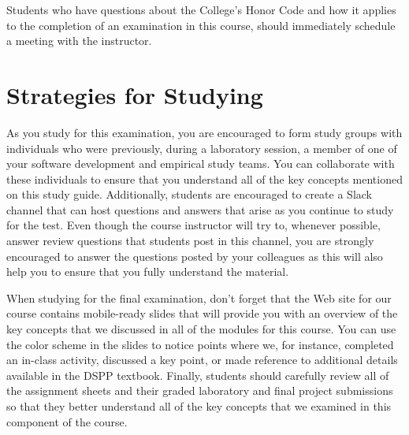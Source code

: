 \noindent Students who have questions about the College's Honor Code and how it applies to the completion of an
examination in this course, should immediately schedule a meeting with the instructor.

\vspace*{-.2in}
\section*{Strategies for Studying}
\vspace*{-.1in}


As you study for this examination, you are encouraged to form study groups with individuals who were previously, during
a laboratory session, a member of one of your software development and empirical study teams. You can collaborate with
these individuals to ensure that you understand all of the key concepts mentioned on this study guide. Additionally,
students are encouraged to create a Slack channel that can host questions and answers that arise as you continue to
study for the test.  Even though the course instructor will try to, whenever possible, answer review questions that
students post in this channel, you are strongly encouraged to answer the questions posted by your colleagues as this
will also help you to ensure that you fully understand the material.  

When studying for the final examination, don't forget that the Web site for our course contains mobile-ready slides that
will provide you with an overview of the key concepts that we discussed in all of the modules for this course. You can
use the color scheme in the slides to notice points where we, for instance, completed an in-class activity, discussed a
key point, or made reference to additional details available in the DSPP textbook. Finally, students should carefully
review all of the assignment sheets and their graded laboratory and final project submissions so that they better
understand all of the key concepts that we examined in this component of the course.


